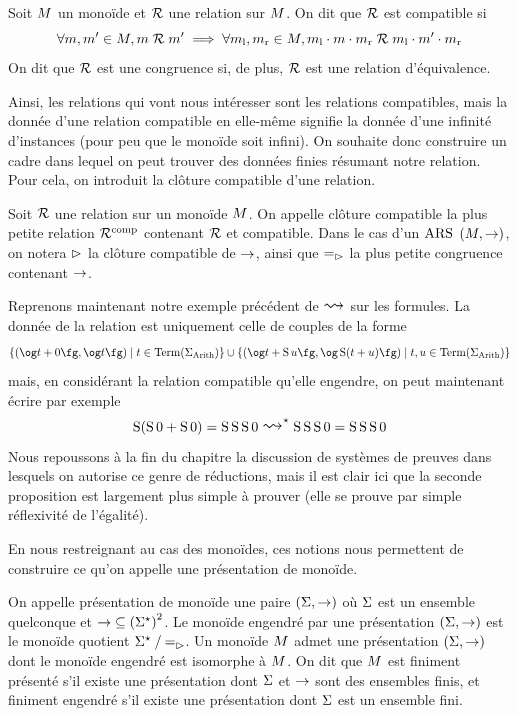 \begin{definition}
  Soit $M$ un monoïde et $\mathrel{\mathcal{R}}$ une relation sur $M$. On dit que
  $\mathrel{\mathcal{R}}$ est compatible si
  \[\forall m,m' \in M, m \mathrel{\mathcal{R}} m' \implies
  \forall m_{\operatorname{l}}, m_{\operatorname{r}} \in M,
  m_{\operatorname{l}}\mathbin{\cdot} m\mathbin{\cdot} m_{\operatorname{r}} \mathrel{\mathcal{R}} m_{\operatorname{l}} \mathbin{\cdot} m' \mathbin{\cdot} m_{\operatorname{r}}\]
  On dit que $\mathrel{\mathcal{R}}$ est une congruence si, de plus, $\mathrel{\mathcal{R}}$ est une
  relation d'équivalence.
\end{definition}

Ainsi, les relations qui vont nous intéresser sont les relations compatibles,
mais la donnée d'une relation compatible en elle-même signifie la donnée d'une
infinité d'instances (pour peu que le monoïde soit infini). On souhaite donc
construire un cadre dans lequel on peut trouver des données finies résumant
notre relation. Pour cela, on introduit la clôture compatible d'une relation.

\begin{definition}
  Soit $\mathrel{\mathcal{R}}$ une relation sur un monoïde $M$. On appelle clôture
  compatible la plus petite relation $\mathrel{\mathcal{R}}^{\mathrm{comp}}$ contenant $\mathrel{\mathcal{R}}$
  et compatible. Dans le cas d'un $\operatorname{ARS}$ $(M,\mathrel{\to})$, on notera
  $\mathrel{\rhd}$ la clôture compatible de $\mathrel{\to}$, ainsi que
  $\varToCRst$ la plus petite congruence contenant $\mathrel{\to}$.
  \index[notation]{$\varToCRst$}
\end{definition}

Reprenons maintenant notre exemple précédent de $\reecr{}$ sur les formules.
La donnée de la relation est uniquement celle de couples de la forme
\[\compr{(\ogM t+0\fgM,\ogM t\fgM)}{t \in \Term(\SignP{\Arith})}\cup
\compr{(\ogM t+\Ss u\fgM,\ogM\Ss(t+u)\fgM)}{t,u \in \Term(\SignP{\Arith})}\]
mais, en considérant la relation compatible qu'elle engendre, on peut
maintenant écrire par exemple
\[\Ss(\Ss 0 + \Ss 0) = \Ss\Ss\Ss 0 \rtClot{\reecr{}}
\Ss\Ss\Ss 0 = \Ss\Ss\Ss 0\]
Nous repoussons à la fin du chapitre la discussion de systèmes de preuves
dans lesquels on autorise ce genre de réductions, mais il est clair ici que
la seconde proposition est largement plus simple à prouver (elle se prouve
par simple réflexivité de l'égalité).

En nous restreignant au cas des monoïdes, ces notions nous permettent de
construire ce qu'on appelle une présentation de monoïde.

\begin{definition}
  On appelle présentation de monoïde une paire $(\Sigma,\mathrel{\to})$ où
  $\Sigma$ est un ensemble quelconque et
  $\mathord{\mathrel{\to}}\subseteq\left(\Sigma^{\star}\right)^2$. Le monoïde
  engendré par une présentation $(\Sigma,\mathrel{\to})$ est le monoïde
  quotient $\mathord{\Sigma^{\star}}\mathbin{/}\mathord{\mathrel{=_{\mathord{\mathrel{\rhd}}}}}$. Un monoïde $M$
  admet une présentation $(\Sigma,\mathrel{\to})$ dont le monoïde engendré
  est isomorphe à $M$. On dit que $M$ est finiment
  présenté s'il existe une présentation dont $\Sigma$ et
  $\mathrel{\to}$ sont des ensembles finis, et finiment engendré s'il
  existe une présentation dont $\Sigma$ est un ensemble fini.
\end{definition}

